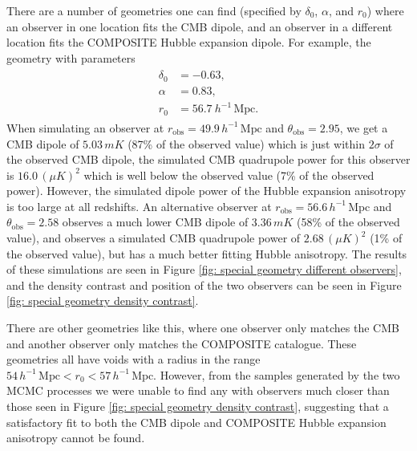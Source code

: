 \documentclass[a4paper,12pt]{report}
\begin{document}
There are a number of geometries one can find (specified by $\delta_0$, $\alpha$, and $r_0$) where an observer in one location fits the CMB dipole, and an observer in a different location fits the COMPOSITE Hubble expansion dipole. For example, the geometry with parameters
\begin{align}
    \begin{split} \label{eqn: BNW special geometry}
        \delta_0 &= -0.63, \\
        \alpha &= 0.83, \\
        r_0 &= 56.7\: h^{-1}\, \text{Mpc}.
    \end{split}
\end{align}
When simulating an observer at $r_\text{obs}=49.9\, h^{-1}\, \text{Mpc}$ and $\theta_\text{obs} = 2.95$, we get a CMB dipole of $5.03\, \si{mK}$ (87\% of the observed value) which is just within $2\sigma$ of the observed CMB dipole, the simulated CMB quadrupole power for this observer is $16.0\, (\mu\si{K})^2$ which is well below the observed value (7\% of the observed power). However, the simulated dipole power of the Hubble expansion anisotropy is too large at all redshifts. An alternative observer at $r_\text{obs}=56.6\, h^{-1}\, \text{Mpc}$ and $\theta_\text{obs} = 2.58$ observes a much lower CMB dipole of $3.36\, \si{mK}$ (58\% of the observed value), and observes a simulated CMB quadrupole power of $2.68\, (\mu\si{K})^2$ (1\% of the observed value), but has a much better fitting Hubble anisotropy. The results of these simulations are seen in Figure \ref{fig: special geometry different observers}, and the density contrast and position of the two observers can be seen in Figure \ref{fig: special geometry density contrast}.

There are other geometries like this, where one observer only matches the CMB and another observer only matches the COMPOSITE catalogue. These geometries all have voids with a radius in the range $54\, h^{-1}\, \text{Mpc} < r_0 < 57\, h^{-1}\, \text{Mpc}$. However, from the samples generated by the two MCMC processes we were unable to find any with observers much closer than those seen in Figure \ref{fig: special geometry density contrast}, suggesting that a satisfactory fit to both the CMB dipole and COMPOSITE Hubble expansion anisotropy cannot be found.
\end{document}
